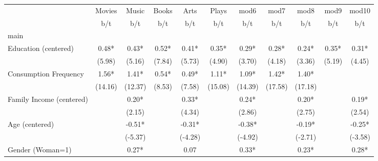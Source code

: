 {
\def\sym#1{\ifmmode^{#1}\else\(^{#1}\)\fi}
\begin{tabular*}{\hsize}{@{\hskip\tabcolsep\extracolsep\fill}l*{10}{c}}
\toprule
                    &\multicolumn{1}{c}{Movies}&\multicolumn{1}{c}{Music}&\multicolumn{1}{c}{Books}&\multicolumn{1}{c}{Arts}&\multicolumn{1}{c}{Plays}&\multicolumn{1}{c}{mod6}&\multicolumn{1}{c}{mod7}&\multicolumn{1}{c}{mod8}&\multicolumn{1}{c}{mod9}&\multicolumn{1}{c}{mod10}\\
                    &         b/t &         b/t &         b/t &         b/t &         b/t &         b/t &         b/t &         b/t &         b/t &         b/t \\
\midrule
main                &             &             &             &             &             &             &             &             &             &             \\
Education (centered)&        0.48*&        0.43*&        0.52*&        0.41*&        0.35*&        0.29*&        0.28*&        0.24*&        0.35*&        0.31*\\
                    &      (5.98) &      (5.16) &      (7.84) &      (5.73) &      (4.90) &      (3.70) &      (4.18) &      (3.36) &      (5.19) &      (4.45) \\
Consumption Frequency&        1.56*&        1.41*&        0.54*&        0.49*&        1.11*&        1.09*&        1.42*&        1.40*&             &             \\
                    &     (14.16) &     (12.37) &      (8.53) &      (7.58) &     (15.08) &     (14.39) &     (17.58) &     (17.18) &             &             \\
Family Income (centered)&             &        0.20*&             &        0.33*&             &        0.24*&             &        0.20*&             &        0.19*\\
                    &             &      (2.15) &             &      (4.34) &             &      (2.86) &             &      (2.75) &             &      (2.54) \\
Age (centered)      &             &       -0.51*&             &       -0.31*&             &       -0.38*&             &       -0.19*&             &       -0.25*\\
                    &             &     (-5.37) &             &     (-4.28) &             &     (-4.92) &             &     (-2.71) &             &     (-3.58) \\
Gender (Woman=1)    &             &        0.27*&             &        0.07 &             &        0.33*&             &        0.23*&             &        0.28*\\

\end{tabular*}}
